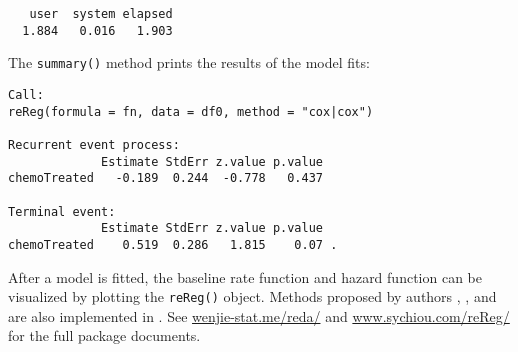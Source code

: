 \begin{Shaded}
\begin{Highlighting}[]
\StringTok{ } \NormalTok{))}
\end{Highlighting}
\end{Shaded}

\begin{verbatim}
   user  system elapsed 
  1.884   0.016   1.903 
\end{verbatim}

The \texttt{summary()} method prints the results of the model fits:

\begin{Shaded}
\begin{Highlighting}[]
\end{Highlighting}
\end{Shaded}

\begin{verbatim}
Call: 
reReg(formula = fn, data = df0, method = "cox|cox")

Recurrent event process:
             Estimate StdErr z.value p.value
chemoTreated   -0.189  0.244  -0.778   0.437

Terminal event:
             Estimate StdErr z.value p.value  
chemoTreated    0.519  0.286   1.815    0.07 .
\end{verbatim}

After a model is fitted, the baseline rate function and hazard function
can be visualized by plotting the \texttt{reReg()} object. Methods
proposed by authors \citet{lin2000semiparametric},
\citet{ghosh2002marginal}, and \citet{ghosh2003semiparametric} are also
implemented in . See \url{wenjie-stat.me/reda/} and
\url{www.sychiou.com/reReg/} for the full package documents.
